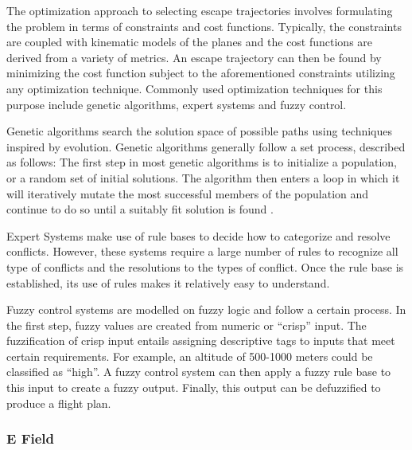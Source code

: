 \documentclass[conference]{IEEEtran}
\begin{document}
The optimization approach to selecting escape trajectories involves formulating the problem in terms of constraints and cost functions.  Typically, the constraints are coupled with kinematic models of the planes and the cost functions are derived from a variety of metrics.  An escape trajectory can then be found by minimizing the cost function subject to the aforementioned constraints utilizing any optimization technique. Commonly used optimization techniques for this purpose include genetic algorithms, expert systems and fuzzy control.

Genetic algorithms search the solution space of possible paths using techniques inspired by evolution.  Genetic algorithms generally follow a set process, described as follows:  The first step in most genetic algorithms is to initialize a population, or a random set of initial solutions.  The algorithm then enters a loop in which it will iteratively mutate the most successful members of the population and continue to do so until a suitably fit solution is found \cite{siudynamic}.

Expert Systems make use of rule bases to decide how to categorize and resolve conflicts.  However, these systems require a large number of rules to recognize all type of conflicts and the resolutions to the types of conflict.  Once the rule base is established, its use of rules makes it relatively easy to understand. \cite{kuchar2000review}

Fuzzy control systems are modelled on fuzzy logic and follow a certain process.  In the first step, fuzzy values are created from numeric or “crisp” input.  The fuzzification of crisp input entails assigning descriptive tags to inputs that meet certain requirements.  For example, an altitude of 500-1000 meters could be classified as “high”.  A fuzzy control system can then apply a fuzzy rule base to this input to create a fuzzy output.  Finally, this output can be defuzzified to produce a flight plan. \cite{2012Fuzzy}

\subsubsection{E Field}
\end{document}
